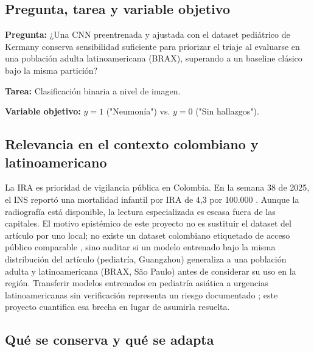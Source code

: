 \documentclass[11pt]{article}
\begin{document}
\subsection{Pregunta, tarea y variable objetivo}

\textbf{Pregunta:} ¿Una CNN preentrenada y ajustada con el dataset pediátrico de Kermany conserva sensibilidad suficiente para priorizar el triaje al evaluarse en una población adulta latinoamericana (BRAX), superando a un baseline clásico bajo la misma partición?

\textbf{Tarea:} Clasificación binaria a nivel de imagen.

\textbf{Variable objetivo:} $y = 1$ ("Neumonía") vs. $y = 0$ ("Sin hallazgos").

\subsection{Relevancia en el contexto colombiano y latinoamericano}

La IRA es prioridad de vigilancia pública en Colombia. En la semana 38 de 2025, el INS reportó una mortalidad infantil por IRA de 4,3 por 100.000 \parencite{ins2025}. Aunque la radiografía está disponible, la lectura especializada es escasa fuera de las capitales.
El motivo epistémico de este proyecto no es sustituir el dataset del artículo por uno local; no existe un dataset colombiano etiquetado de acceso público comparable \parencite{kaushal2020}, sino auditar si un modelo entrenado bajo la misma distribución del artículo (pediatría, Guangzhou) generaliza a una población adulta y latinoamericana (BRAX, São Paulo) antes de considerar su uso en la región. Transferir modelos entrenados en pediatría asiática a urgencias latinoamericanas sin verificación representa un riesgo documentado \parencite{zech2018}; este proyecto cuantifica esa brecha en lugar de asumirla resuelta.

\subsection{Qué se conserva y qué se adapta}
\end{document}

